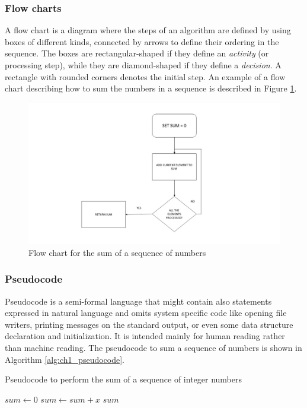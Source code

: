 \subsubsection*{Flow charts}
A flow chart is a diagram where the steps of an algorithm are defined by using boxes of different kinds, connected by arrows to define their ordering in the sequence. The boxes are rectangular-shaped if they define an \textit{activity} (or processing step), while they are diamond-shaped if they define a \textit{decision}. A rectangle with rounded corners denotes the initial step. An example of a flow chart describing how to sum the numbers in a sequence is described in Figure \ref{fig:ch1_flow_chart}.

\begin{figure}
	\centering
	\includegraphics[width = \textwidth]{Figures/flow_chart}
	\caption{Flow chart for the sum of a sequence of numbers}
	\label{fig:ch1_flow_chart}
\end{figure}

\subsubsection*{Pseudocode}
Pseudocode is a semi-formal language that might contain also statements expressed in natural language and omits system specific code like opening file writers, printing messages on the standard output, or even some data structure declaration and initialization. It is intended mainly for human reading rather than machine reading. The pseudocode to sum a sequence of numbers is shown in Algorithm \ref{alg:ch1_pseudocode}.

\begin{algorithm}
	\caption{Pseudocode to perform the sum of a sequence of integer numbers}
	\label{alg:ch1_pseudocode}
	\begin{algorithmic}
			\State $sum \gets 0$
				\State $sum \gets sum + x$
			\EndFor
			\State \Return $sum$
		\EndFunction
	\end{algorithmic}
\end{algorithm}

